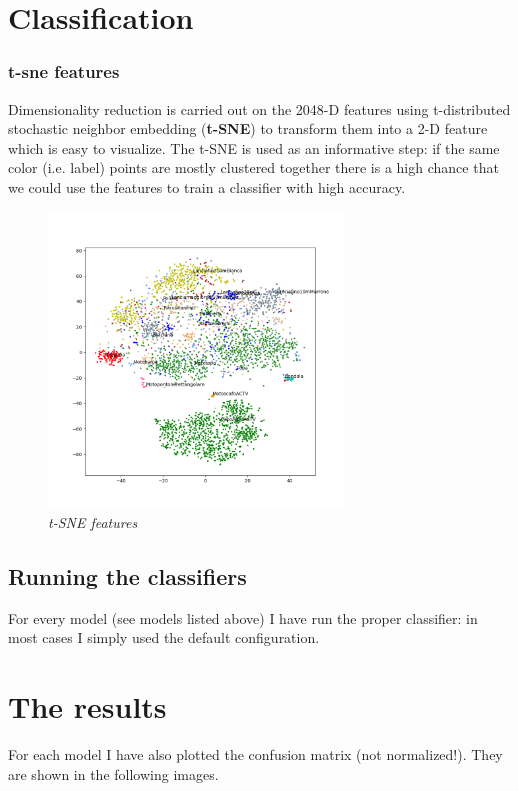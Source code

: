 \documentclass[12pt]{article}
\begin{document}
\section{Classification}
\subsubsection{t-sne features}
Dimensionality reduction is carried out on the 2048-D features using t-distributed stochastic neighbor embedding (\textbf{t-SNE}) to transform them into a 2-D feature which is easy to visualize. The t-SNE is used as an informative step: if the same color (i.e. label) points are mostly clustered together there is a high chance that we could use the features to train a classifier with high accuracy.

\begin{figure}[!ht]
	\centering %
	\includegraphics[width=0.7\textwidth]{../code/output/features.png} %
	\caption{\textit{t-SNE features}} %
	\label{fig:2dh}
\end{figure}

\subsection{Running the classifiers}
For every model (see models listed above) I have run the proper classifier: in most cases I simply used the default configuration.

\section{The results}
\label{sec:results}
For each model I have also plotted the confusion matrix (not normalized!). They are shown in the following images.
\end{document}
